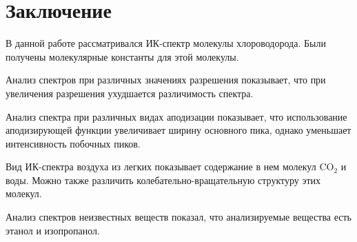 \clearpage
\section{Заключение}
В данной работе рассматривался ИК-спектр молекулы хлороводорода. Были получены молекулярные константы для этой молекулы.

Анализ спектров при различных значениях разрешения показывает, что при увеличения разрешения ухудшается различимость спектра.

Анализ спектра при различных видах аподизации показывает, что использование аподизирующей функции увеличивает ширину основного пика, однако уменьшает интенсивность побочных пиков.

Вид ИК-спектра воздуха из легких показывает содержание в нем молекул CO$_2$ и воды. Можно также различить колебательно-вращательную структуру этих молекул.

Анализ спектров неизвестных веществ показал, что анализируемые вещества есть этанол и изопропанол.